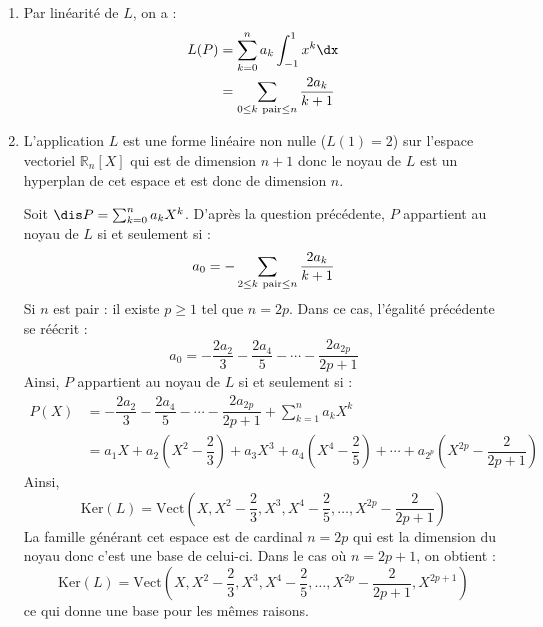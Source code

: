 \documentclass[a4paper,10pt]{report}
\begin{document}
\corr \begin{enumerate}
\item Par linéarité de $L$, on a :
\begin{align*}
L(P) & = \sum_{k=0}^n a_k \int_{-1}^{1} x^k \dx \\
& = \sum_{0 \leq k \hbox{ {\scriptsize pair}} \leq n} \dfrac{2a_k}{k+1} 
\end{align*}
\item L'application $L$ est une forme linéaire non nulle ($L(1)=2$) sur l'espace vectoriel $\mathbb{R}_n[X]$ qui est de dimension $n+1$ donc le noyau de $L$ est un hyperplan de cet espace et est donc de dimension $n$.

\medskip

\noindent Soit $\dis P= \sum_{k=0}^n a_k X^k$. D'après la question précédente, $P$ appartient au noyau de $L$ si et seulement si :
$$ a_0 = - \sum_{2 \leq k \hbox{ {\scriptsize pair}} \leq n} \dfrac{2a_k}{k+1}$$
Si $n$ est pair : il existe $p \geq 1$ tel que $n=2p$. Dans ce cas, l'égalité précédente se réécrit :
$$ a_0 = - \dfrac{2a_2}{3} - \dfrac{2a_4}{5} - \cdots - \dfrac{2a_{2p}}{2p+1}$$
Ainsi, $P$ appartient au noyau de $L$ si et seulement si :
\begin{align*}
P(X) & =  - \dfrac{2a_2}{3} - \dfrac{2a_4}{5} - \cdots - \dfrac{2a_{2p}}{2p+1} + \sum_{k=1}^n a_k X^k \\
& = a_1 X + a_2 \left(X^2   - \dfrac{2}{3} \right) + a_3 X^3 +  a_4 \left(X^4   - \dfrac{2}{5} \right) + \cdots +  a_{2^p} \left(X^{2p}   - \dfrac{2}{2p+1} \right)
\end{align*}
Ainsi,
$$ \textrm{Ker}(L) = \textrm{Vect} \left(X,X^2   - \dfrac{2}{3},X^3,X^4   - \dfrac{2}{5}, \ldots, X^{2p}   - \dfrac{2}{2p+1} \right)$$
La famille générant cet espace est de cardinal $n=2p$ qui est la dimension du noyau donc c'est une base de celui-ci. Dans le cas où $n=2p+1$, on obtient :
$$ \textrm{Ker}(L) = \textrm{Vect} \left(X,X^2   - \dfrac{2}{3},X^3,X^4   - \dfrac{2}{5}, \ldots, X^{2p}   - \dfrac{2}{2p+1}, X^{2p+1} \right)$$
ce qui donne une base pour les mêmes raisons.

\end{enumerate}
\end{document}
